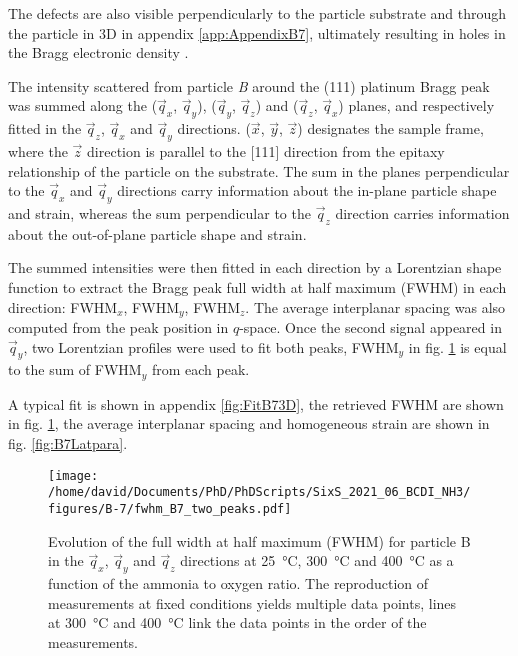 The defects are also visible perpendicularly to the particle substrate and through the particle in 3D in appendix \ref{app:AppendixB7}, ultimately resulting in holes in the Bragg electronic density \parencite{Clark2015, Dupraz2015}.

The intensity scattered from particle \textit{B} around the (111) platinum Bragg peak was summed along the ($\vec{q}_x$, $\vec{q}_y$), ($\vec{q}_y$, $\vec{q}_z$) and ($\vec{q}_z$, $\vec{q}_x$) planes, and respectively fitted in the $\vec{q}_z$, $\vec{q}_x$ and $\vec{q}_y$ directions.
($\vec{x}$, $\vec{y}$, $\vec{z}$) designates the sample frame, where the $\vec{z}$ direction is parallel to the [111] direction from the epitaxy relationship of the particle on the substrate.
The sum in the planes perpendicular to the $\vec{q}_x$ and $\vec{q}_y$ directions carry information about the in-plane particle shape and strain, whereas the sum perpendicular to the $\vec{q}_z$ direction carries information about the out-of-plane particle shape and strain.

The summed intensities were then fitted in each direction by a Lorentzian shape function to extract the Bragg peak full width at half maximum (FWHM) in each direction: FWHM$_x$, FWHM$_y$, FWHM$_z$.
The average interplanar spacing was also computed from the peak position in $q$-space.
Once the second signal appeared in $\vec{q}_y$, two Lorentzian profiles were used to fit both peaks, FWHM$_y$ in fig. \ref{fig:B7FWHM} is equal to the sum of FWHM$_y$ from each peak.

A typical fit is shown in appendix \ref{fig:FitB73D}, the retrieved FWHM are shown in fig. \ref{fig:B7FWHM}, the average interplanar spacing and homogeneous strain are shown in fig. \ref{fig:B7Latpara}.

\begin{figure}[!htb]
    \centering
    \texttt{[image: /home/david/Documents/PhD/PhDScripts/SixS\_2021\_06\_BCDI\_NH3/figures/B-7/fwhm\_B7\_two\_peaks.pdf]}
    \caption{
        Evolution of the full width at half maximum (FWHM) for particle B in the $\vec{q}_x$, $\vec{q}_y$ and $\vec{q}_z$ directions at \qty{25}{\degreeCelsius}, \qty{300}{\degreeCelsius} and \qty{400}{\degreeCelsius} as a function of the ammonia to oxygen ratio.
        The reproduction of measurements at fixed conditions yields multiple data points, lines at \qty{300}{\degreeCelsius} and \qty{400}{\degreeCelsius} link the data points in the order of the measurements.
    }
    \label{fig:B7FWHM}
\end{figure}

